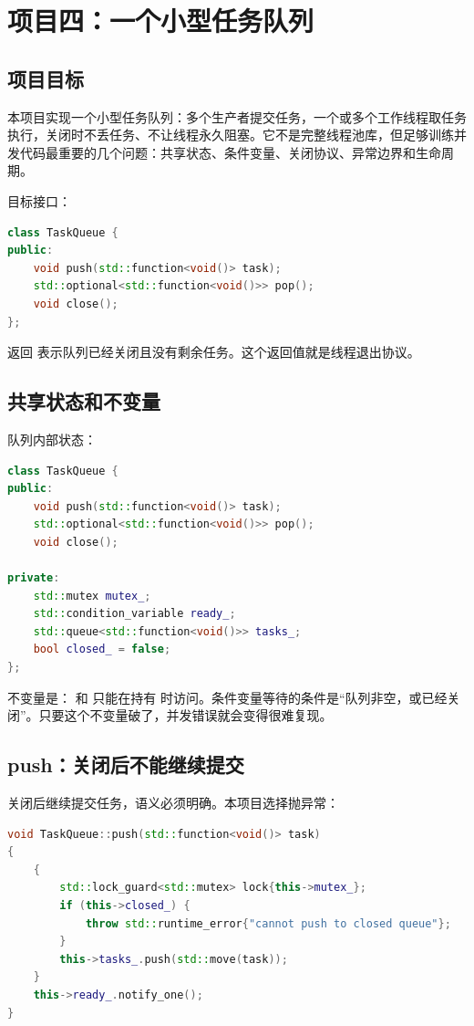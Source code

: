 \chapter{项目四：一个小型任务队列}

\section{项目目标}

本项目实现一个小型任务队列：多个生产者提交任务，一个或多个工作线程取任务执行，关闭时不丢任务、不让线程永久阻塞。它不是完整线程池库，但足够训练并发代码最重要的几个问题：共享状态、条件变量、关闭协议、异常边界和生命周期。

目标接口：

\begin{lstlisting}[language=C++,caption={任务队列接口}]
class TaskQueue {
public:
    void push(std::function<void()> task);
    std::optional<std::function<void()>> pop();
    void close();
};
\end{lstlisting}

 返回  表示队列已经关闭且没有剩余任务。这个返回值就是线程退出协议。

\section{共享状态和不变量}

队列内部状态：

\begin{lstlisting}[language=C++,caption={任务队列状态}]
class TaskQueue {
public:
    void push(std::function<void()> task);
    std::optional<std::function<void()>> pop();
    void close();

private:
    std::mutex mutex_;
    std::condition_variable ready_;
    std::queue<std::function<void()>> tasks_;
    bool closed_ = false;
};
\end{lstlisting}

不变量是： 和  只能在持有  时访问。条件变量等待的条件是“队列非空，或已经关闭”。只要这个不变量破了，并发错误就会变得很难复现。

\section{push：关闭后不能继续提交}

关闭后继续提交任务，语义必须明确。本项目选择抛异常：

\begin{lstlisting}[language=C++,caption={提交任务}]
void TaskQueue::push(std::function<void()> task)
{
    {
        std::lock_guard<std::mutex> lock{this->mutex_};
        if (this->closed_) {
            throw std::runtime_error{"cannot push to closed queue"};
        }
        this->tasks_.push(std::move(task));
    }
    this->ready_.notify_one();
}
\end{lstlisting}

